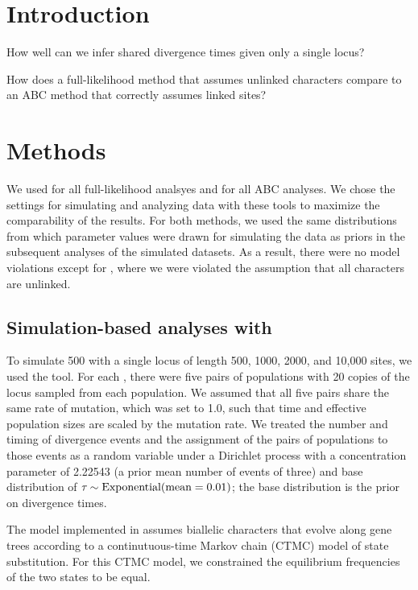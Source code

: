 \section{Introduction}

How well can we infer shared divergence times given only a single locus?

How does a full-likelihood method that assumes unlinked characters
compare to an ABC method that correctly assumes linked sites?

\section{Methods}

We used
\ecoevolity \citep[Version 0.2.1 (commit 8ac8228);][]{Oaks2018ecoevolity}
for all full-likelihood analsyes and
\pymsbayes \citep[Version 0.2.4;][]{Oaks2014dpp}
for all ABC analyses.
We chose the settings for simulating and analyzing data with these tools to
maximize the comparability of the results.
For both methods, we used the same distributions from which parameter values
were drawn for simulating the data as priors in the subsequent analyses of the
simulated datasets.
As a result, there were no model violations except for \ecoevolity, where we
were violated the assumption that all characters are unlinked.

\subsection{Simulation-based analyses with \ecoevolity}

To simulate 500 \datasets with a single locus of length 500, 1000, 2000, and
10,000 sites,
we used the \simcoevolity tool.
For each \dataset, there were five pairs of populations with 20 copies of the
locus sampled from each population.
We assumed that all five pairs share the same rate of mutation, which was set
to 1.0, such that time and effective population sizes are scaled by the
mutation rate.
We treated the number and timing of divergence events and the assignment of the
pairs of populations to those events as a random variable under a Dirichlet
process with a concentration parameter of 2.22543 (a prior mean number of
events of three) and base distribution of $\tau_{} \sim \textrm{Exponential}(\textrm{mean} = 0.01)$;
the base distribution is the prior on divergence times.

The model implemented in \ecoevolity assumes biallelic characters that evolve
along gene trees according to a continutuous-time Markov chain (CTMC) model of
state substitution.
For this CTMC model, we constrained the equilibrium frequencies of the two
states to be equal.


